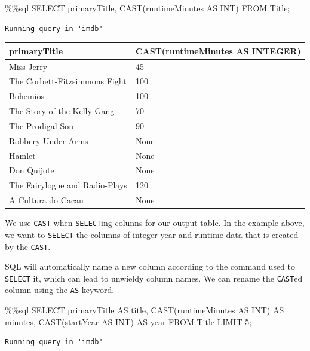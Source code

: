 \documentclass[
  letterpaper,
  DIV=11,
  numbers=noendperiod]{scrreprt}
\newenvironment{Shaded}{\begin{snugshade}}{\end{snugshade}}
\newcommand{\DecValTok}[1]{\textcolor[rgb]{0.68,0.00,0.00}{#1}}
\newcommand{\NormalTok}[1]{\textcolor[rgb]{0.00,0.23,0.31}{#1}}
\newcommand{\OperatorTok}[1]{\textcolor[rgb]{0.37,0.37,0.37}{#1}}
\begin{document}
\begin{Shaded}
\begin{Highlighting}[]
\OperatorTok{\%\%}\NormalTok{sql}
\NormalTok{SELECT primaryTitle, CAST(runtimeMinutes AS INT)}
\NormalTok{FROM Title}\OperatorTok{;}
\end{Highlighting}
\end{Shaded}

\begin{verbatim}
Running query in 'imdb'
\end{verbatim}

\begin{longtable}[]{@{}ll@{}}
\toprule\noalign{}
primaryTitle & CAST(runtimeMinutes AS INTEGER) \\
\midrule\noalign{}
\endhead
\bottomrule\noalign{}
\endlastfoot
Miss Jerry & 45 \\
The Corbett-Fitzsimmons Fight & 100 \\
Bohemios & 100 \\
The Story of the Kelly Gang & 70 \\
The Prodigal Son & 90 \\
Robbery Under Arms & None \\
Hamlet & None \\
Don Quijote & None \\
The Fairylogue and Radio-Plays & 120 \\
A Cultura do Cacau & None \\
\end{longtable}

We use \texttt{CAST} when \texttt{SELECT}ing colunns for our output
table. In the example above, we want to \texttt{SELECT} the columns of
integer year and runtime data that is created by the \texttt{CAST}.

SQL will automatically name a new column according to the command used
to \texttt{SELECT} it, which can lead to unwieldy column names. We can
rename the \texttt{CAST}ed column using the \texttt{AS} keyword.

\begin{Shaded}
\begin{Highlighting}[]
\OperatorTok{\%\%}\NormalTok{sql}
\NormalTok{SELECT primaryTitle AS title, CAST(runtimeMinutes AS INT) AS minutes, CAST(startYear AS INT) AS year}
\NormalTok{FROM Title}
\NormalTok{LIMIT }\DecValTok{5}\OperatorTok{;}
\end{Highlighting}
\end{Shaded}

\begin{verbatim}
Running query in 'imdb'
\end{verbatim}
\end{document}
